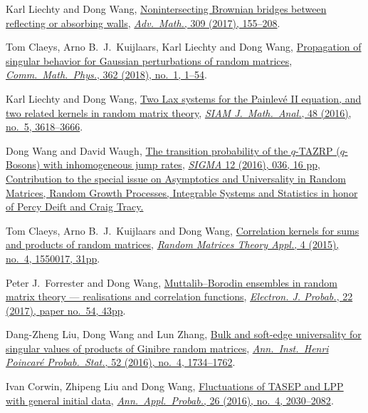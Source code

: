 \documentclass[12pt, a4paper]{article}
\begin{document}
\begin{etaremune}
\item
  Karl Liechty and Dong Wang, \href{http://arxiv.org/abs/1608.08712}{Nonintersecting Brownian bridges between reflecting or absorbing walls}, \href{https://doi.org/10.1016/j.aim.2016.10.024}{\textit{Adv.\ Math.}, 309 (2017), 155--208}.
\item
  Tom Claeys, Arno B.~J.~Kuijlaars, Karl Liechty and Dong Wang, \href{http://arxiv.org/abs/1608.05870}{Propagation of singular behavior for Gaussian perturbations of random matrices}, \href{https://doi.org/10.1007/s00220-018-3195-8}{\textit{Comm.\ Math.\ Phys.}, 362 (2018), no.\ 1, 1--54}.
\item
  Karl Liechty and Dong Wang, \href{http://arxiv.org/abs/1601.01603}{Two Lax systems for the Painlev\'{e} II equation, and two related kernels in random matrix theory}, \href{https://doi.org/10.1137/16M1056080}{\textit{SIAM J.\ Math.\ Anal.}, 48 (2016), no.\ 5, 3618--3666}.
\item
  Dong Wang and David Waugh, \href{http://arxiv.org/abs/1512.01612}{The transition probability of the $q$-TAZRP ($q$-Bosons) with inhomogeneous jump rates}, \href{https://doi.org/10.3842/SIGMA.2016.037}{\textit{SIGMA} 12 (2016), 036, 16 pp, Contribution to the special issue on Asymptotics and Universality in Random Matrices, Random Growth Processes, Integrable Systems and Statistics in honor of Percy Deift and Craig Tracy.}
\item 
  Tom Claeys, Arno B.~J.~Kuijlaars and Dong Wang, \href{http://arxiv.org/abs/1505.00610}{Correlation kernels for sums and products of random matrices}, \href{https://doi.org/10.1142/S2010326315500173}{\textit{Random Matrices Theory Appl.}, 4 (2015), no.\ 4, 1550017, 31pp}.
\item
  Peter J.~Forrester and Dong Wang, \href{http://arxiv.org/abs/1502.07147}{Muttalib--Borodin ensembles in random matrix theory --- realisations and correlation functions}, \href{https://doi.org/10.1214/17-EJP62}{\textit{Electron. J. Probab.}, 22 (2017), paper no.\ 54, 43pp}.
\item
  Dang-Zheng Liu, Dong Wang and Lun Zhang, \href{http://arxiv.org/abs/1412.6777}{Bulk and soft-edge universality for singular values of products of Ginibre random matrices}, \href{https://doi.org/10.1214/15-AIHP696}{\textit{Ann.\ Inst.\ Henri Poincar\'{e} Probab.\ Stat.}, 52 (2016), no.\ 4, 1734--1762}.
\item
  Ivan Corwin, Zhipeng Liu and Dong Wang, \href{http://arxiv.org/abs/1412.5087}{Fluctuations of TASEP and LPP with general initial data}, \href{https://doi.org/10.1214/15-AAP1139}{\textit{Ann.\ Appl.\ Probab.}, 26 (2016), no.\ 4, 2030--2082}.

\end{etaremune}
\end{document}
